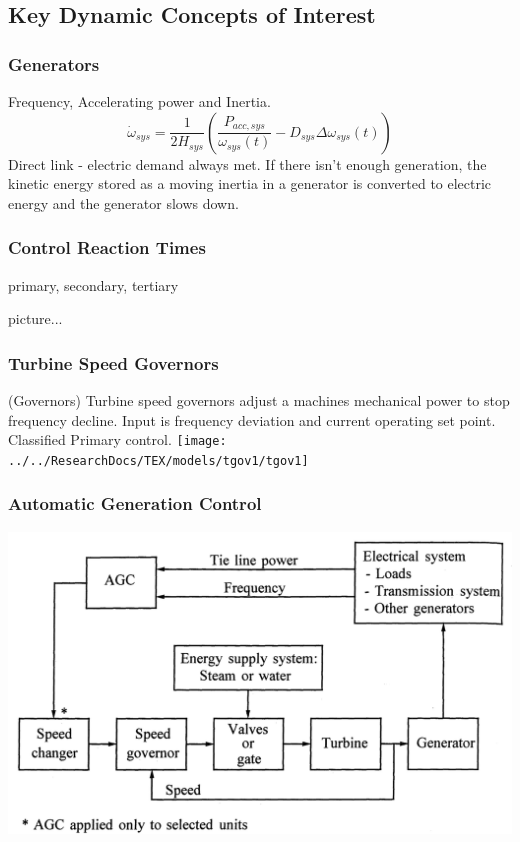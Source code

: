 \documentclass[14pt, unknownkeysallowed]{beamer}
\begin{document}
\subsection{Key Dynamic Concepts of Interest}
\begin{frame}
\frametitle{Generators}
Frequency, Accelerating power and Inertia.\\
\[ \dot{\omega}_{sys} = \dfrac{1}{2H_{sys} } \left( \dfrac{P_{acc, sys} }{\omega_{sys}(t)} - D_{sys}\Delta\omega_{sys}(t)  \right)\]
Direct link - electric demand always met. If there isn't enough generation, the kinetic energy stored as a moving inertia in a generator is converted to electric energy and the generator slows down.
\end{frame}
\begin{frame}
\frametitle{Control Reaction Times}
primary, secondary, tertiary

picture...
\end{frame}
\begin{frame}
\frametitle{Turbine Speed Governors}
(Governors)
Turbine speed governors adjust a machines mechanical power to stop frequency decline. Input is frequency deviation and current operating set point. Classified Primary control.
{\centering\texttt{[image: ../../ResearchDocs/TEX/models/tgov1/tgov1]}}
\end{frame}
\begin{frame}
\frametitle{Automatic Generation Control}
{\centering\includegraphics[height=.8\textheight]{AGCblockdiagram}}
{\footnotesize\cite{Kundur}}
\end{frame}
\end{document}
